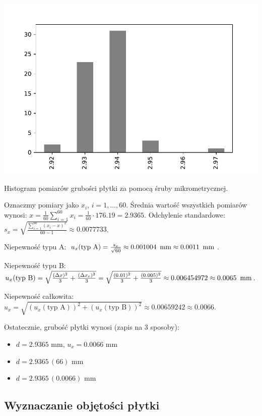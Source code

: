 \documentclass[a4paper]{article}
\begin{document}
\begin{table}
\centering
\includegraphics[scale=0.7]{hist.pdf}
\caption{Histogram pomiarów grubości płytki za pomocą śruby mikrometrycznej.}
\end{table}

Oznaczmy pomiary jako $x_i$, $i = 1, \dots, 60$.
Średnia wartość wszystkich pomiarów wynosi: $x = \frac{1}{60} \sum_{i = 1}^{60} x_i = \frac{1}{60} \cdot 176.19 = 2.9365$.
Odchylenie standardowe: $s_x = \sqrt{\frac{\sum_{i=1}^{60} (x_i - x)^2}{60 - 1}} \approx 0.0077733$.

Niepewność typu A: $u_x (\text{typ A}) = \frac{s_x}{\sqrt{60}} \approx 0.001004 \enskip \text{mm} \approx 0.0011 \enskip \text{mm}$.

Niepewność typu B: $u_x (\text{typ B}) = \sqrt{\frac{(\Delta x)^2}{3} + \frac{(\Delta x_e)^2}{3}} = \sqrt{\frac{(0.01)^2}{3} + \frac{(0.005)^2}{3}} \approx 0.006454972 \approx 0.0065 \enskip \text{mm}$.

Niepewność całkowita: $u_x = \sqrt{(u_x (\text{typ A}))^2 + (u_x (\text{typ B}))^2} \approx 0.00659242 \approx 0.0066$.

Ostatecznie, grubość płytki wynosi (zapis na 3 sposoby):

\begin{itemize}
\item $d = 2.9365$ mm, $u_x = 0.0066$ mm
\item $d = 2.9365 \, (66)$ mm
\item $d = 2.9365 \, (0.0066)$ mm
\end{itemize}

\subsection{Wyznaczanie objętości płytki}
\end{document}
